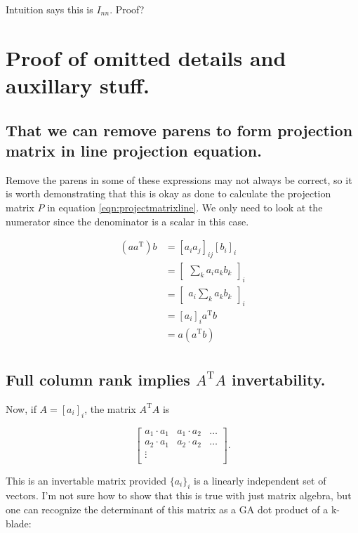 \documentclass{article}      %
\DeclareMathOperator{\TextTranspose}{T}
\newcommand{\transpose}[1]{{{#1}^{\TextTranspose}}}
\begin{document}
Intuition says this is $I_{nn}$.  Proof?


\section{ Proof of omitted details and auxillary stuff. }

\subsection{ That we can remove parens to form projection matrix in line projection equation. }

Remove the parens in some of these expressions may not always be correct, so it is worth demonstrating that this is okay as
done to calculate the projection matrix $P$ in 
equation \ref{eqn:projectmatrixline}.
We only need to look at the numerator since the denominator is a scalar in this case.

\begin{align*}
(a \transpose{a}) b
&= [ a_i a_j ]_{ij} [b_i]_i \\
&= 
{\begin{bmatrix}
\sum_k a_i a_k b_k
\end{bmatrix}
}_i \\
&= 
{\begin{bmatrix}
a_i \sum_k a_k b_k
\end{bmatrix}
}_i \\
&= [ a_i ]_i \transpose{a} b \\
&= a (\transpose{a} b) \\
\end{align*}

\subsection{ Full column rank implies $\transpose{A}A$ invertability. }

Now, if $A = [a_i]_i$, 
the matrix $\transpose{A}A$ is

\[
\begin{bmatrix}
{a_1} \cdot {a_1} & {a_1} \cdot {a_2} & \hdots \\
{a_2} \cdot {a_1} & {a_2} \cdot {a_2} & \hdots \\
\vdots & & \\
\end{bmatrix}.
\]

This is an invertable matrix provided $\{a_i\}_i$ is a linearly independent set of vectors.
I'm not sure how to show that this is true with just matrix algebra, but one can recognize the determinant of this matrix as a GA dot product of a k-blade:
\end{document}
